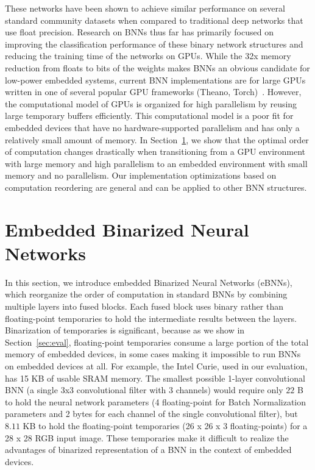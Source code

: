 \documentclass[10pt,emptycopyrightspace]{ewsn-proc}
\begin{document}
These networks have been shown to achieve similar performance on several standard community datasets when compared to traditional deep networks that use float precision. Research on BNNs thus far has primarily focused on improving the classification performance of these binary network structures and reducing the training time of the networks on GPUs. While the 32x memory reduction from floats to bits of the weights makes BNNs an obvious candidate for low-power embedded systems, current BNN implementations are for large GPUs written in one of several popular GPU frameworks (Theano, Torch)~\cite{team2016theano,collobert2002torch}. However, the computational model of GPUs is organized for high parallelism by reusing large temporary buffers efficiently. This computational model is a poor fit for embedded devices that have no hardware-supported parallelism and has only a relatively small amount of memory. In Section~\ref{sec:model}, we show that the optimal order of computation changes drastically when transitioning from a GPU environment with large memory and high parallelism to an embedded environment with small memory and no parallelism. Our implementation optimizations based on computation reordering are general and can be applied to other BNN structures.


\section{Embedded Binarized Neural Networks}
\label{sec:model}
In this section, we introduce embedded Binarized Neural Networks (eBNNs), which reorganize the order of computation in standard BNNs by combining multiple layers into fused blocks. Each fused block uses binary rather than floating-point temporaries to hold the intermediate results between the layers. Binarization of temporaries is significant, because as we show in Section~\ref{sec:eval}, floating-point temporaries consume a large portion of the total memory of embedded devices, in some cases making it impossible to run BNNs on embedded devices at all. For example, the Intel Curie, used in our evaluation, has 15 KB of usable SRAM memory. The smallest possible 1-layer convolutional BNN (a single 3x3 convolutional filter with 3 channels) would require only $22$ B to hold the neural network parameters (4 floating-point for Batch Normalization parameters and 2 bytes for each channel of the single convolutional filter), but $8.11$ KB to hold the floating-point temporaries (26 x 26 x 3 floating-points) for a 28 x 28 RGB input image. These temporaries make it difficult to realize the advantages of binarized representation of a BNN in the context of embedded devices.
\end{document}
